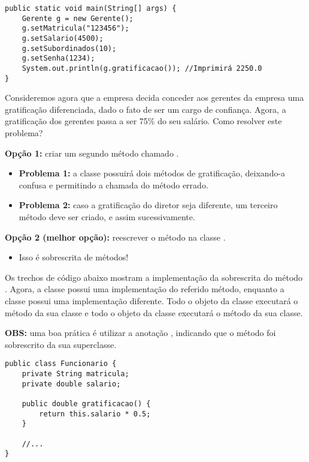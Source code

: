 \begin{verbatim}
public static void main(String[] args) {
	Gerente g = new Gerente();
	g.setMatricula("123456");
	g.setSalario(4500);
	g.setSubordinados(10);
	g.setSenha(1234);
	System.out.println(g.gratificacao()); //Imprimirá 2250.0
}
\end{verbatim}
 
 
Consideremos agora que a empresa decida conceder aos gerentes da empresa uma gratificação diferenciada, dado o fato de ser um cargo de confiança. Agora, a gratificação dos gerentes passa a ser 75\% do seu salário. Como resolver este problema?

\textbf{Opção 1:} criar um segundo método chamado .
\begin{itemize}
	\item \textbf{Problema 1:} a classe  possuirá dois métodos de gratificação, deixando-a confusa e permitindo a chamada do método errado.
	\item \textbf{Problema 2:} caso a gratificação do diretor seja diferente, um terceiro método deve ser criado, e assim sucessivamente.
\end{itemize}

\textbf{Opção 2 (melhor opção):} reescrever o método  na classe .
\begin{itemize}
	\item Isso é sobrescrita de métodos!
\end{itemize}

Os trechos de código abaixo mostram a implementação da sobrescrita do método . Agora, a classe  possui uma implementação do referido método, enquanto a classe  possui uma implementação diferente. Todo o objeto da classe  executará o método  da sua classe e todo o objeto da classe  executará o método  da sua classe.

\textbf{OBS: } uma boa prática é utilizar a anotação , indicando que o método foi sobrescrito da sua superclasse.

\begin{verbatim}
public class Funcionario {
	private String matricula;
	private double salario;
	
	public double gratificacao() {
		return this.salario * 0.5;
	}
	
	//...
}
\end{verbatim}
 
